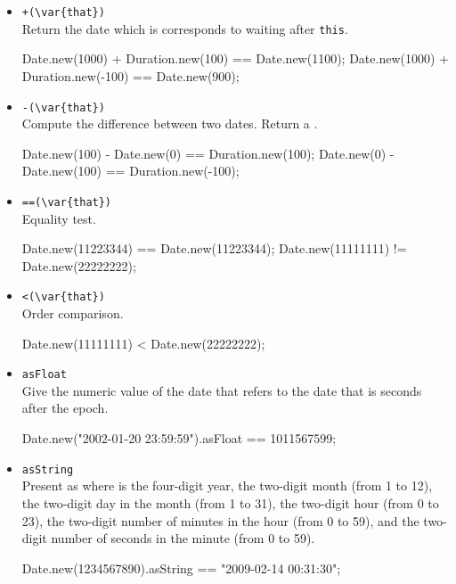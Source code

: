 \begin{itemize}
\item \lstinline|+(\var{that})|\\
  Return the date which is corresponds to waiting 
   after \lstinline|this|.
\begin{urbiassert}[firstnumber=last]
Date.new(1000) + Duration.new(100) == Date.new(1100);
Date.new(1000) + Duration.new(-100) == Date.new(900);
\end{urbiassert}

\item \lstinline|-(\var{that})|\\
  Compute the difference between two dates.  Return a
  .
\begin{urbiassert}[firstnumber=last]
Date.new(100) - Date.new(0) == Duration.new(100);
Date.new(0) - Date.new(100) == Duration.new(-100);
\end{urbiassert}

\item \lstinline|==(\var{that})|\\
  Equality test.
\begin{urbiassert}[firstnumber=last]
Date.new(11223344) == Date.new(11223344);
Date.new(11111111) != Date.new(22222222);
\end{urbiassert}

\item \lstinline|<(\var{that})|\\
  Order comparison.
\begin{urbiassert}[firstnumber=last]
Date.new(11111111) < Date.new(22222222);
\end{urbiassert}

\item \lstinline|asFloat|\\
  Give the numeric value of the date that refers to the date that is 
seconds after the epoch.
\begin{urbiassert}[firstnumber=last]
Date.new("2002-01-20 23:59:59").asFloat == 1011567599;
\end{urbiassert}

\item \lstinline|asString|\\
  Present as  where  is the four-digit
  year,  the two-digit month (from 1 to 12),  the
  two-digit day in the month (from 1 to 31),  the two-digit
  hour (from 0 to 23),  the two-digit number of minutes in the
  hour (from 0 to 59), and  the two-digit number of seconds in
  the minute (from 0 to 59).
\begin{urbiassert}[firstnumber=last]
Date.new(1234567890).asString == "2009-02-14 00:31:30";
\end{urbiassert}


\end{itemize}
